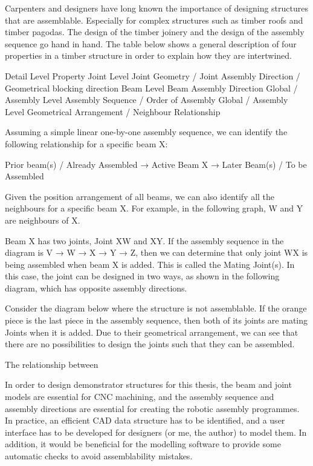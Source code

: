 Carpenters and designers have long known the importance of designing structures that are assemblable. Especially for complex structures such as timber roofs and timber pagodas. The design of the timber joinery and the design of the assembly sequence go hand in hand. The table below shows a general description of four properties in a timber structure in order to explain how they are intertwined.

Detail Level
Property
Joint Level
Joint Geometry / Joint Assembly Direction / Geometrical blocking direction 
Beam Level
Beam Assembly Direction
Global / Assembly Level
Assembly Sequence / Order of Assembly
Global / Assembly Level
Geometrical Arrangement / Neighbour Relationship


Assuming a simple linear one-by-one assembly sequence, we can identify the following relationship for a specific beam X:

Prior beam(s) / Already Assembled → Active Beam X → Later Beam(s) / To be Assembled

Given the position arrangement of all beams, we can also identify all the neighbours for a specific beam X. For example, in the following graph, W and Y are neighbours of X.

Beam X has two joints, Joint XW and XY. If the assembly sequence in the diagram is V → W → X → Y → Z, then we can determine that only joint WX is being assembled when beam X is added. This is called the Mating Joint(s). In this case, the joint can be designed in two ways, as shown in the following diagram, which has opposite assembly directions.

Consider the diagram below where the structure is not assemblable. If the orange piece is the last piece in the assembly sequence, then both of its joints are mating Joints when it is added. Due to their geometrical arrangement, we can see that there are no possibilities to design the joints such that they can be assembled. 

The relationship between 

In order to design demonstrator structures for this thesis, the beam and joint models are essential for CNC machining, and the assembly sequence and assembly directions are essential for creating the robotic assembly programmes. In practice, an efficient CAD data structure has to be identified, and a user interface has to be developed for designers (or me, the author) to model them. In addition, it would be beneficial for the modelling software to provide some automatic checks to avoid assemblability mistakes. 

